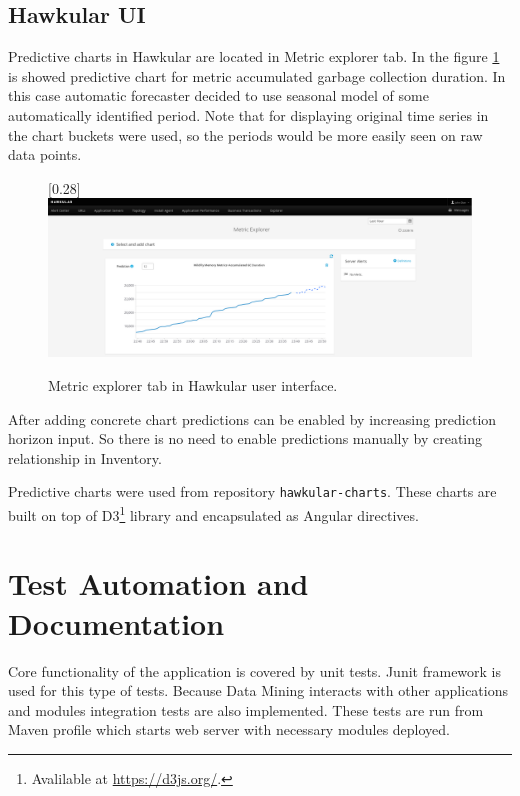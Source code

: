         \subsection{Hawkular UI}
        Predictive charts in Hawkular are located in Metric explorer tab. In the figure \ref{img:hawkular-explorer}
        is showed predictive chart for metric accumulated garbage collection duration. In this case automatic
        forecaster decided to use seasonal model of some automatically identified period. Note that for displaying
        original time series in the chart buckets were used, so the periods would be more easily seen on raw data
        points.

        \begin{figure}[H]
            \begin{center}
                \scalebox{0.185}[0.28]{\includegraphics[angle=0]{img/hawkular-explorer.pdf}}
                \caption{Metric explorer tab in Hawkular user interface.}
                \label{img:hawkular-explorer}
            \end{center}
        \end{figure}

        After adding concrete chart predictions can be enabled by increasing prediction horizon input.
        So there is no need to enable predictions manually by creating relationship in Inventory.

        Predictive charts were used from repository \texttt{hawkular-charts}. These charts are built on top of
        D3\footnote{Avalilable at \url{https://d3js.org/}.} library and encapsulated as Angular directives.

    \section{Test Automation and Documentation}
    Core functionality of the application is covered by unit tests. Junit framework is used for this type of tests.
    Because Data Mining interacts with other applications and modules integration tests are also implemented. These
    tests are run from Maven profile which starts web server with necessary modules deployed.

